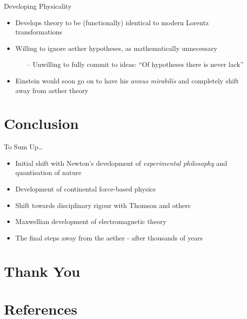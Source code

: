 \documentclass{beamer}
\begin{document}
\begin{frame}{Developing Physicality}
	\begin{itemize}
		\item Develops theory to be (functionally) identical to modern Lorentz transformations\autocite{darrigol}
		\item Willing to ignore aether hypotheses, as mathematically unnecessary{ \autocite{poincare}}
			\begin{itemize}
				\item[--] Unwilling to fully commit to ideas: ``Of hypotheses there is never lack''{ \autocite{fond}}
			\end{itemize}
		\item Einstein would soon go on to have his \emph{annus mirabilis} and completely shift away from aether theory
	\end{itemize}
\end{frame}
\section{Conclusion}%
\begin{frame}{To Sum Up\ldots}
	\begin{itemize}
		\item Initial shift with Newton's development of \emph{experimental philosophy} and quantisation of nature
		\item  Development of continental force-based physics 
		\item  Shift towards disciplinary rigour with Thomson and others
		\item  Maxwellian development of electromagnetic theory
		\item The final steps away from the aether - after thousands of years
	\end{itemize}
\end{frame}
\section{\color{mGreen}Thank You}%
\section{References}%
\begin{frame}[allowframebreaks]
	\nocite{*}
	\printbibliography[heading=none]
\end{frame}
\end{document}

